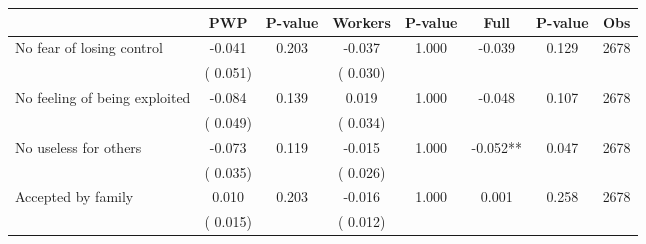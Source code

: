 
\begin{tabular}{l*{7}{c}}\hline&\multicolumn{1}{c}{PWP}&\multicolumn{1}{c}{P-value}&\multicolumn{1}{c}{Workers}&\multicolumn{1}{c}{P-value}&\multicolumn{1}{c}{Full}&\multicolumn{1}{c}{P-value}&\multicolumn{1}{c}{Obs} \\ \hline

 No fear of losing control       &             -0.041       &        0.203  &             -0.037       &        1.000  &             -0.039       &              0.129 &  2678 \\ 
                       &       (       0.051)             &                               &       (       0.030)                     &                               &                                               &                                &                      \\ 

 No feeling of being exploited       &             -0.084       &        0.139  &              0.019       &        1.000  &             -0.048       &              0.107 &  2678 \\ 
                       &       (       0.049)             &                               &       (       0.034)                     &                               &                                               &                                &                      \\ 

 No useless for others       &             -0.073       &        0.119  &             -0.015       &        1.000  &             -0.052**       &              0.047 &  2678 \\ 
                       &       (       0.035)             &                               &       (       0.026)                     &                               &                                               &                                &                      \\ 

 Accepted by family       &              0.010       &        0.203  &             -0.016       &        1.000  &              0.001       &              0.258 &  2678 \\ 
                       &       (       0.015)             &                               &       (       0.012)                     &                               &                                               &                                &                      \\ 


\end{tabular}
